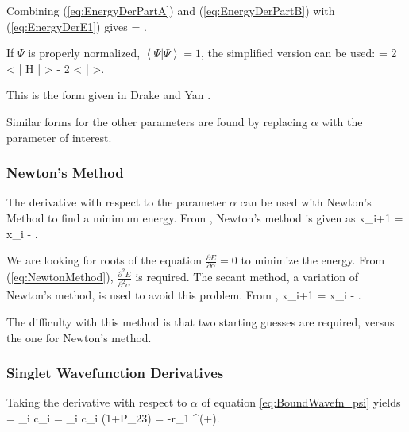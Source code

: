 \documentclass[Dissertation.tex]{subfiles}
\begin{document}
Combining (\ref{eq:EnergyDerPartA}) and (\ref{eq:EnergyDerPartB}) with (\ref{eq:EnergyDerE1}) gives
\beq
{} = .
\label{eq:EnergyDerivative}
\eeq

\noindent If $\Psi$ is properly normalized, $\left< \Psi \Big| \Psi \right> = 1$, the simplified version can be used:
\beq
{} = 2 \left< \Psi \Big| H \Big| \frac{\partial\Psi}{\partial \alpha} \right> - 2 \left< \Psi \Big| \frac{\partial\Psi}{\partial \alpha} \right>.
\label{eq:EnergyDerivativeNorm}
\eeq

\noindent This is the form given in Drake and Yan \cite{Drake1995}.

Similar forms for the other parameters are found by replacing $\alpha$ with the parameter of interest.


\subsubsection{Newton's Method}
The derivative with respect to the parameter $\alpha$ can be used with Newton's Method to find a minimum energy.  From \cite{Sauer2006}, Newton's method is given as
\beq
x_{i+1} = x_i - .
\label{eq:NewtonMethod}
\eeq

We are looking for roots of the equation $\displaystyle\frac{\partial E}{\partial \alpha} = 0$ to minimize the energy.  From (\ref{eq:NewtonMethod}), $\displaystyle\frac{\partial^2 E}{\partial^2 \alpha}$ is required.  The secant method, a variation of Newton's method, is used to avoid this problem.  From \cite{Sauer2006},
\beq
x_{i+1} = x_i - .
\eeq

\noindent The difficulty with this method is that two starting guesses are required, versus the one for Newton's method.


\subsubsection{Singlet Wavefunction Derivatives}
Taking the derivative with respect to $\alpha$ of equation \ref{eq:BoundWavefn_psi} yields
\beq
\frac{\partial \Psi^+}{\partial \alpha} = \sum_i c_i  = \sum_i c_i (1+P_{23})  = -r_1 \Psi^{(+)}.
\label{eq:PsiDerAlpha}
\eeq
\end{document}
